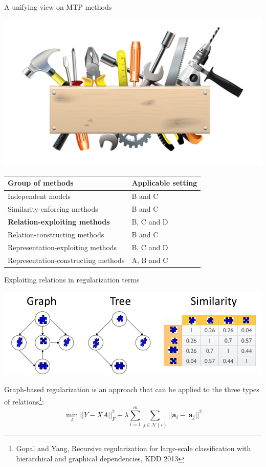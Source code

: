 \documentclass[]{beamer}
\renewcommand{\vec}[1]{\boldsymbol{#1}}
\renewcommand{\alert}[1]{\textbf{\color{putblue} #1}}
\begin{document}
\begin{frame}{A unifying view on MTP methods}

\begin{center}
\includegraphics[scale=0.3]{pics/tools}

\begin{tabular}{ll}
\hline
Group of methods & Applicable setting \\
\hline
\hline
Independent models & B and C \\
Similarity-enforcing methods & B and C   \\ 
\alert{Relation-exploiting methods} & B, C and D  \\
Relation-constructing methods & B and C \\
Representation-exploiting methods & B, C and D \\
Representation-constructing methods & A, B and C \\
\hline  
\end{tabular}
\end{center}
\end{frame}

\begin{frame}{Exploiting relations in regularization terms}

\begin{center}
\includegraphics[width=\textwidth]{pics/targetrelations}
\end{center} \pause 

Graph-based regularization is an approach that can be applied to the three types of relations\footnote{Gopal and Yang, Recursive regularization for large-scale classification with hierarchical
and graphical dependencies, KDD 2013}: 
\begin{equation*}
\min_A ||Y - XA ||^2_F + \lambda \sum_{i=1}^m \sum_{j \in \mathcal{N}(i)} ||\vec{a}_i - \ \vec{a}_j||^2 
\end{equation*}

\end{frame}
\end{document}
